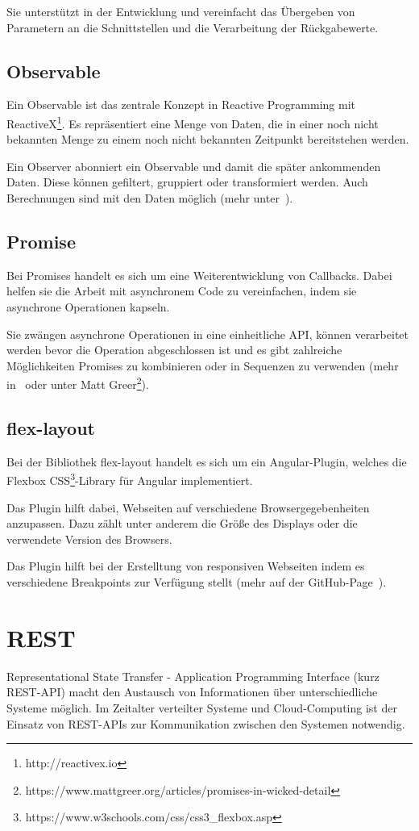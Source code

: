 Sie unterstützt in der Entwicklung und vereinfacht das Übergeben von Parametern an die Schnittstellen und die
Verarbeitung der Rückgabewerte.

\subsection{Observable}
Ein Observable ist das zentrale Konzept in Reactive Programming mit ReactiveX\footnote{http://reactivex.io}. Es
repräsentiert eine Menge von Daten, die in einer noch nicht bekannten Menge zu einem noch nicht bekannten Zeitpunkt
bereitstehen werden.

Ein Observer abonniert ein Observable und damit die später ankommenden Daten. Diese können gefiltert, gruppiert oder
transformiert werden. Auch Berechnungen sind mit den Daten möglich (mehr unter~\cite{book_grundlagen_observable}).

\subsection{Promise}
Bei Promises handelt es sich um eine Weiterentwicklung von Callbacks. Dabei helfen sie die Arbeit mit asynchronem Code
zu vereinfachen, indem sie asynchrone Operationen kapseln.

Sie zwängen asynchrone Operationen in eine einheitliche API, können verarbeitet werden bevor die Operation abgeschlossen
ist und es gibt zahlreiche Möglichkeiten Promises zu kombinieren oder in Sequenzen zu verwenden (mehr
in~\cite{book_grundlagen_promises} oder unter Matt
Greer\footnote{https://www.mattgreer.org/articles/promises-in-wicked-detail}).

\subsection{flex-layout}
Bei der Bibliothek flex-layout handelt es sich um ein Angular-Plugin, welches die Flexbox
CSS\footnote{https://www.w3schools.com/css/css3\_flexbox.asp}-Library für Angular implementiert.

Das Plugin hilft dabei, Webseiten auf verschiedene Browsergegebenheiten anzupassen. Dazu zählt unter anderem die Größe
des Displays oder die verwendete Version des Browsers.

Das Plugin hilft bei der Erstelltung von responsiven Webseiten indem es verschiedene Breakpoints zur Verfügung stellt
(mehr auf der GitHub-Page~\cite{online_grundlagen_flexlayout}).

\section{REST}
Representational State Transfer - Application Programming Interface (kurz REST-API) macht den Austausch von Informationen
über unterschiedliche Systeme möglich. Im Zeitalter verteilter Systeme und Cloud-Computing ist der Einsatz von REST-APIs
zur Kommunikation zwischen den Systemen notwendig.

